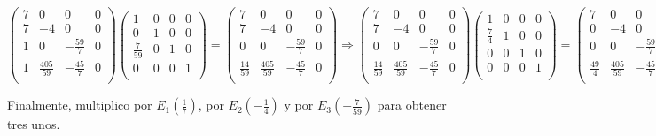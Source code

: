 \documentclass[11pt, a4paper]{article}
\newif\IfInSansMode
\theoremstyle{theorem-style}
\theoremstyle{definition-style}
\theoremstyle{remark-style}
\theoremstyle{example-style}
\begin{document}
$\begin{pmatrix}
7 & 0 & 0 & 0 \\
7 & -4 & 0 & 0 \\
1 & 0 & -\frac{59}{7} & 0 \\
1 & \frac{405}{59} & -\frac{45}{7} & 0 \\
\end{pmatrix}
\begin{pmatrix}
1 & 0 & 0 & 0 \\
0 & 1 & 0 & 0 \\
\frac{7}{59} & 0 & 1 & 0 \\
0 & 0 & 0 & 1 \\
\end{pmatrix}   
 = 
\begin{pmatrix}
7 & 0 & 0 & 0 \\
7 & -4 & 0 & 0 \\
0 & 0 & -\frac{59}{7} & 0 \\
\frac{14}{59} & \frac{405}{59} & -\frac{45}{7} & 0 \\
\end{pmatrix} \Longrightarrow
\begin{pmatrix}
7 & 0 & 0 & 0 \\
7 & -4 & 0 & 0 \\
0 & 0 & -\frac{59}{7} & 0 \\
\frac{14}{59} & \frac{405}{59} & -\frac{45}{7} & 0 \\
\end{pmatrix} \begin{pmatrix}
1 & 0 & 0 & 0 \\
\frac{7}{4} & 1 & 0 & 0 \\
0 & 0 & 1 & 0 \\
0 & 0 & 0 & 1 \\
\end{pmatrix} =
\begin{pmatrix}
7 & 0 & 0 & 0 \\
0 & -4 & 0 & 0 \\
0 & 0 & -\frac{59}{7} & 0 \\
\frac{49}{4} & \frac{405}{59} & -\frac{45}{7} & 0 \\
\end{pmatrix}$

Finalmente, multiplico por $E_1(\frac{1}{7})$, por $E_2(-\frac{1}{4})$ y por $E_3(-\frac{7}{59})$ para obtener tres unos. \\
\end{document}

